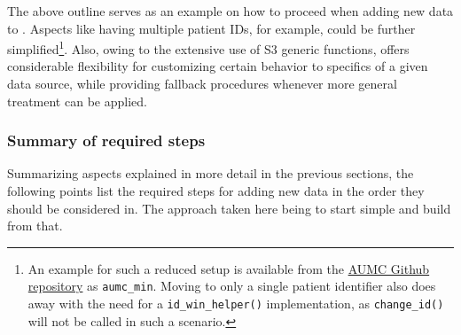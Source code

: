 \documentclass[
  notitle]{jss}
\begin{document}
The above outline serves as an example on how to proceed when adding new
data to . Aspects like having multiple patient IDs, for
example, could be further simplified\footnote{An example for such a
  reduced setup is available from the
  \href{https://github.com/eth-mds/aumc}{AUMC Github repository} as
  \texttt{aumc\_min}. Moving to only a single patient identifier also
  does away with the need for a \texttt{id\_win\_helper()}
  implementation, as \texttt{change\_id()} will not be called in such a
  scenario.}. Also, owing to the extensive use of S3 generic functions,
 offers considerable flexibility for customizing certain
behavior to specifics of a given data source, while providing fallback
procedures whenever more general treatment can be applied.

\hypertarget{summary-of-required-steps}{%
\subsubsection{Summary of required
steps}\label{summary-of-required-steps}}

Summarizing aspects explained in more detail in the previous sections,
the following points list the required steps for adding new data in the
order they should be considered in. The approach taken here being to
start simple and build from that.
\end{document}
